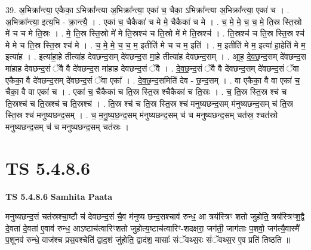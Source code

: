 \documentclass[17pt]{extarticle}
\begin{document}
39. अ॒भिक्रा᳚न्त्या॒ एकैका॒ ऽभिक्रा᳚न्त्या अ॒भिक्रा᳚न्त्या॒ एका॑ च॒ चैका॒ ऽभिक्रा᳚न्त्या अ॒भिक्रा᳚न्त्या॒ एका॑ च । . अ॒भिक्रा᳚न्त्या॒ इत्य॒भि - क्रा॒न्त्यै॒ । . एका॑ च॒ चैकैका॑ च मे मे॒ चैकैका॑ च मे । . च॒ मे॒ मे॒ च॒ च॒ मे॒ ति॒स्र स्ति॒स्रो मे॑ च च मे ति॒स्रः । . मे॒ ति॒स्र स्ति॒स्रो मे॑ मे ति॒स्रश्च॑ च ति॒स्रो मे॑ मे ति॒स्रश्च॑ । . ति॒स्रश्च॑ च ति॒स्र स्ति॒स्र श्च॑ मे मे च ति॒स्र स्ति॒स्र श्च॑ मे । . च॒ मे॒ मे॒ च॒ च॒ म॒ इतीति॑ मे च च म॒ इति॑ । . म॒ इतीति॑ मे म॒ इत्या॑ हा॒हेति॑ मे म॒ इत्या॑ह । . इत्या॑हा॒हे तीत्या॑ह देवछन्द॒सम् दे॑वछन्द॒स मा॒हे तीत्या॑ह देवछन्द॒सम् । . आ॒ह॒ दे॒व॒छ॒न्द॒सम् दे॑वछन्द॒स मा॑हाह देवछन्द॒सं ॅवै वै दे॑वछन्द॒स मा॑हाह देवछन्द॒सं ॅवै । . दे॒व॒छ॒न्द॒सं ॅवै वै दे॑वछन्द॒सम् दे॑वछन्द॒सं ॅवा एकैका॒ वै दे॑वछन्द॒सम् दे॑वछन्द॒सं ॅवा एका᳚ । . दे॒व॒छ॒न्द॒समिति॑ देव - छ॒न्द॒सम् । . वा एकैका॒ वै वा एका॑ च॒ चैका॒ वै वा एका॑ च । . एका॑ च॒ चैकैका॑ च ति॒स्र स्ति॒स्र श्चैकैका॑ च ति॒स्रः । . च॒ ति॒स्र स्ति॒स्र श्च॑ च ति॒स्रश्च॑ च ति॒स्रश्च॑ च ति॒स्रश्च॑ । . ति॒स्र श्च॑ च ति॒स्र स्ति॒स्र श्च॑ मनुष्यछन्द॒सम् म॑नुष्यछन्द॒सम् च॑ ति॒स्र स्ति॒स्र श्च॑ मनुष्यछन्द॒सम् । . च॒ म॒नु॒ष्य॒छ॒न्द॒सम् म॑नुष्यछन्द॒सम् च॑ च मनुष्यछन्द॒सम् चत॑स्र॒ श्चत॑स्रो मनुष्यछन्द॒सम् च॑ च मनुष्यछन्द॒सम् चत॑स्रः । \newline
\pagebreak
{}

\section{ TS 5.4.8.6 }

\textbf{TS 5.4.8.6 } \newline
\textbf{Samhita Paata} \newline

मनुष्यछन्द॒सं चत॑स्रश्चा॒ष्टौ च॑ देवछन्द॒सं चै॒व म॑नुष्य छन्द॒सश्चाव॑ रुन्ध॒ आ त्रय॑स्त्रिꣳ शतो जुहोति॒ त्रय॑स्त्रिꣳश॒द्वै दे॒वता॑ दे॒वता॑ ए॒वाव॑ रुन्ध॒ आऽष्टाच॑त्वारिꣳशतो जुहोत्य॒ष्टाच॑त्वारिꣳ-शदक्षरा॒ जग॑ती॒ जाग॑ताः प॒शवो॒ जग॑त्यै॒वास्मै॑ प॒शूनव॑ रुन्धे॒ वाज॑श्च प्रस॒वश्चेति॑ द्वाद॒शं जु॑होति॒ द्वाद॑श॒ मासाः᳚ संॅवथ्स॒रः सं॑ॅवथ्स॒र ए॒व प्रति॑ तिष्ठति ॥ \newline
\end{document}
